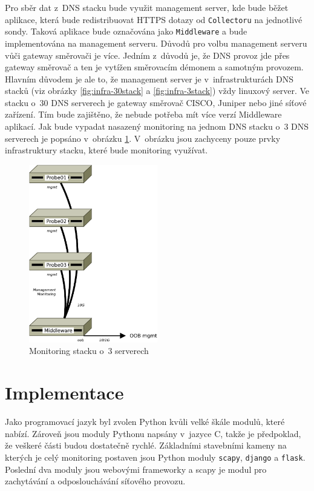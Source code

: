 \documentclass[thesis=M,czech]{src/FITthesis}[2019/12/23]
\begin{document}
Pro sběr dat z~DNS stacku bude využit management server, kde bude běžet aplikace, která bude redistribuovat HTTPS dotazy od \texttt{Collectoru} na jednotlivé sondy. Taková aplikace bude označována jako \texttt{Middleware} a bude implementována na management serveru. Důvodů pro volbu management serveru vůči gateway směrovači je více. Jedním z~důvodů je, že DNS provoz jde přes gateway směrovač a ten je vytížen směrovacím démonem a samotným provozem. Hlavním důvodem je ale to, že management server je v~infrastrukturách DNS stacků (viz obrázky \ref{fig:infra-30stack} a \ref{fig:infra-3stack}) vždy linuxový server. Ve stacku o~30 DNS serverech je gateway směrovač CISCO, Juniper nebo jiné síťové zařízení. Tím bude zajištěno, že nebude potřeba mít více verzí Middleware aplikací. Jak bude vypadat nasazený monitoring na jednom DNS stacku o~3 DNS serverech je popsáno v~obrázku \ref{fig:monitor-3stack}. V~obrázku jsou zachyceny pouze prvky infrastruktury stacku, které bude monitoring využívat. 

\begin{figure}[ht]
  \centering
   \includegraphics[width=0.5\textwidth]{images/monitoring-3stack.pdf}
   \caption{Monitoring stacku o~3 serverech}
     \label{fig:monitor-3stack}
\end{figure}





\section{Implementace}
Jako programovací jazyk byl zvolen Python kvůli velké škále modulů, které nabízí.  Zároveň jsou moduly Pythonu napsány v~jazyce C, takže je předpoklad, že veškeré části budou dostatečně rychlé. Základními stavebními kameny na kterých je celý monitoring postaven jsou Python moduly \texttt{scapy}, \texttt{django} a \texttt{flask}. Poslední dva moduly jsou webovými frameworky a scapy je modul pro zachytávání a odposlouchávání síťového provozu. 
\end{document}
